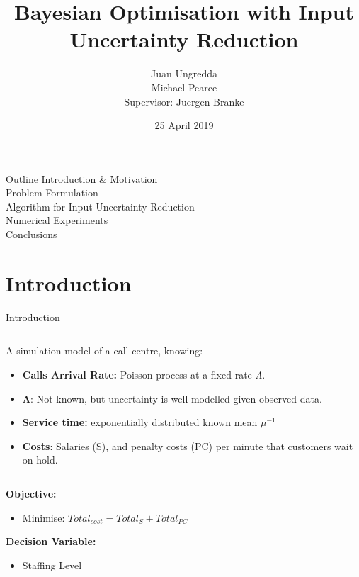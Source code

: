 \documentclass{beamer}
\title[]{Bayesian Optimisation with Input Uncertainty Reduction}
\author[Juan Ungredda]{\small Juan Ungredda \\
 Michael Pearce \\
Supervisor: Juergen Branke }
\institute[]{University of Warwick}
\date{25 April 2019}
\begin{document}

\begin{frame}{Outline}
	Introduction \& Motivation\\
	\vspace{5mm}
	Problem Formulation\\
	\vspace{5mm}
	Algorithm for Input Uncertainty Reduction\\
	\vspace{5mm}
	Numerical Experiments\\
	\vspace{5mm}
	Conclusions\\
\end{frame}

\section{Introduction}

\begin{frame}{Introduction}
\begin{columns}[T]
	
	\begin{column}{1\textwidth}
		A simulation model of a call-centre, knowing: 
		\begin{itemize}
			\item \textbf{Calls Arrival Rate:} Poisson process at a fixed rate $\Lambda$. 
			\item $\mathbf{\Lambda}$: Not known, but uncertainty is well modelled given observed data.
			\item \textbf{Service time:} exponentially distributed known mean $\mu^{-1}$
			\item \textbf{Costs}: Salaries (S), and penalty costs (PC) per minute that
			customers wait on hold.\newline
		\end{itemize}
	\end{column}
\end{columns}

\textbf{Objective:}
\begin{itemize}
	\item Minimise: $Total_{cost} =  Total_{S} + Total_{PC}$
\end{itemize}

\textbf{Decision Variable:}
\begin{itemize}
	\item Staffing Level
\end{itemize}

\end{frame}
\end{document}

